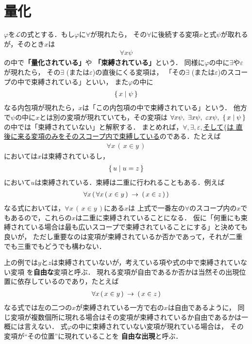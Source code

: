 \section{量化}
	$\varphi$を$\mathcal{L}$の式とする．もし$\varphi$に$\forall$が現れたら，
	その$\forall$に後続する変項$x$と式$\psi$が取れるが，そのとき$x$は
	\begin{align}
		\forall x \psi
	\end{align}
	の中で{\bf 「量化されている」}や
	{\bf 「束縛されている」}という．
	同様に$\varphi$の中に$\exists$や$\varepsilon$が現れたら，
	その$\exists$ (または$\varepsilon$)の直後にくる変項は，
	「その$\exists$ (または$\varepsilon$)のスコープの中で束縛されている」といい，
	また$\varphi$の中に
	\begin{align}
		\{\, x \mid \psi\, \}
	\end{align}
	なる内包項が現れたら，$x$は「この内包項の中で束縛されている」という．
	他方で$\psi$の中に$x$とは別の変項が現れていても，その変項は
	$\forall x \psi,\ \exists x \psi,\ \varepsilon x \psi,\ \{\, x \mid \psi\, \}$
	の中では「束縛されていない」と解釈する．
	まとめれば，\underline{$\forall,\exists,\varepsilon,$そして$\{$は
	直後に来る変項のみをそのスコープ内で束縛している}のである．たとえば
	\begin{align}
		\forall x\, (\, x \in y\, )
	\end{align}
	においては$x$は束縛されているし，
	\begin{align}
		\{\, u \mid u = z\, \}
	\end{align}
	において$u$は束縛されている．束縛は二重に行われることもある．例えば
	\begin{align}
		\forall x\, (\, \forall x\, (\, x \in y\, ) \hspace{0.25em}\rightarrow\hspace{0.25em} (\, x \in z\, )\, )
	\end{align}
	なる式においては，$\forall x\, (\, x \in y\, )$にある$x$は
	上式で一番左の$\forall$のスコープ内の$x$でもあるので，これらの$x$は二重に束縛されていることになる．
	仮に「何重にも束縛されている場合は最も広いスコープで束縛されていることにする」と決めても良いが，
	ただし重要なのは変項が束縛されているか否かであって，それが二重でも三重でもどうでも構わない．
	
	上の例では$y$と$z$は束縛されていないが，考えている項や式の中で束縛されていない変項
	を{\bf 自由な}変項と呼ぶ．
	現れる変項が自由であるか否かは当然その出現位置に依存しているのであり，たとえば
	\begin{align}
		\forall x\, (\, x \in y\, ) \hspace{0.25em}\rightarrow\hspace{0.25em} (\, x \in z\, )
	\end{align}
	なる式では左の二つの$x$が束縛されている一方で右の$x$は自由であるように，
	同じ変項が複数個所に現れる場合はその変項が束縛されているか自由であるかは一概には言えない．
	式$\varphi$の中に束縛されていない変項が現れている場合は，
	その変項が``その位置''に現れていることを
	{\bf 自由な出現}と呼ぶ．
	
